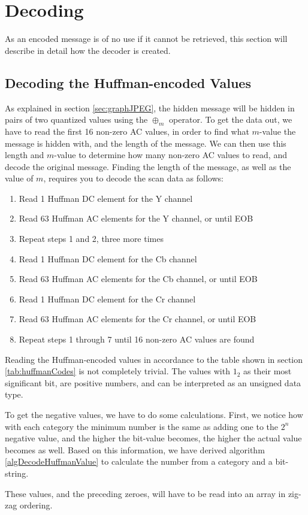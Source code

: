 \section{Decoding}
As an encoded message is of no use if it cannot be retrieved, this section will describe in detail how the decoder is created.



\subsection{Decoding the Huffman-encoded Values}
As explained in section \ref{sec:graphJPEG}, the hidden message will be hidden in pairs of two quantized values using the $\oplus_m$ operator.
To get the data out, we have to read the first 16 non-zero AC values, in order to find what $m$-value the message is hidden with, and the length of the message.
We can then use this length and $m$-value to determine how many non-zero AC values to read, and decode the original message.
Finding the length of the message, as well as the value of $m$, requires you to decode the scan data as follows:
\begin{enumerate}
	\item Read 1 Huffman DC element for the Y channel
	\item Read 63 Huffman AC elements for the Y channel, or until EOB
	\item Repeat steps 1 and 2, three more times
	\item Read 1 Huffman DC element for the Cb channel
	\item Read 63 Huffman AC elements for the Cb channel, or until EOB
	\item Read 1 Huffman DC element for the Cr channel
	\item Read 63 Huffman AC elements for the Cr channel, or until EOB
	\item Repeat steps 1 through 7 until 16 non-zero AC values are found
\end{enumerate}
Reading the Huffman-encoded values in accordance to the table shown in section \ref{tab:huffmanCodes} is not completely trivial.
The values with $1_2$ as their most significant bit, are positive numbers, and can be interpreted as an unsigned data type.

To get the negative values, we have to do some calculations. 
First, we notice how with each category the minimum number is the same as adding one to the $2^n$ negative value, and the higher the bit-value becomes, the higher the actual value becomes as well. 
Based on this information, we have derived algorithm \ref{algDecodeHuffmanValue} to calculate the number from a category and a bit-string.

These values, and the preceding zeroes, will have to be read into an array in zig-zag ordering.


